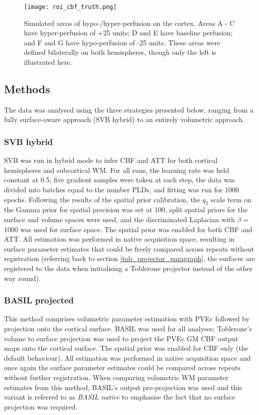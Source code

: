 \begin{figure}[H]
\centering
\texttt{[image: roi\_cbf\_truth.png]}
\caption{Simulated areas of hypo-/hyper-perfusion on the cortex. Areas A - C have hyper-perfusion of +25 units; D and E have baseline perfusion; and F and G have hypo-perfusion of -25 units. These areas were defined bilaterally on both hemispheres, though only the left is illustrated here.}
\label{roi_cbf_truth} 
\end{figure}


\subsection{Methods}

The data was analysed using the three strategies presented below, ranging from a fully surface-aware approach (SVB hybrid) to an entirely volumetric approach. 

\subsubsection{SVB hybrid}

SVB was run in hybrid mode to infer CBF and ATT for both cortical hemispheres and subcortical WM. For all runs, the learning rate was held constant at 0.5, five gradient samples were taken at each step, the data was divided into batches equal to the number PLDs, and fitting was run for 1000 epochs. Following the results of the spatial prior calibration, the $q_2$ scale term on the Gamma prior for spatial precision was set at 100, split spatial priors for the surface and volume spaces were used, and the discriminated Laplacian with $\beta =$ 1000 was used for surface space. The spatial prior was enabled for both CBF and ATT. All estimation was performed in native acquisition space, resulting in surface parameter estimates that could be freely compared across repeats without registration (referring back to section \ref{tob_projector_paragraph}, the surfaces are registered to the data when initialising a Toblerone projector instead of the other way round). 

\subsubsection{BASIL projected}

This method comprises volumetric parameter estimation with PVEc followed by projection onto the cortical surface. BASIL was used for all analyses; Toblerone's volume to surface projection was used to project the PVEc GM CBF output maps onto the cortical surface. The spatial prior was enabled for CBF only (the default behaviour). All estimation was performed in native acquisition space and once again the surface parameter estimates could be compared across repeats without further registration. When comparing volumetric WM parameter estimates from this method, BASIL's output pre-projection was used and this variant is referred to as \textit{BASIL native} to emphasise the fact that no surface projection was required. 

